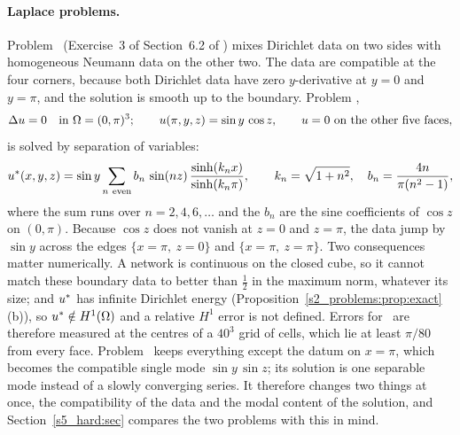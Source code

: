 \paragraph{Laplace problems.}
Problem \PLtwo\ (Exercise~3 of Section~6.2 of \citet{strauss2008}) mixes Dirichlet data on two
sides with homogeneous Neumann data on the other two. The data are compatible at the four
corners, because both Dirichlet data have zero $y$-derivative at $y=0$ and $y=\pi$, and the
solution is smooth up to the boundary. Problem \PLthree,
\begin{equation}\label{s2_problems:eq:lap3d}
\Delta u=0\quad\text{in }\Omega=(0,\pi)^3;\qquad u(\pi,y,z)=\sin y\,\cos z,\qquad
u=0\ \text{on the other five faces,}
\end{equation}
is solved by separation of variables:
\begin{equation}\label{s2_problems:eq:lap3d-exact}
u^{*}(x,y,z)=\sin y\sum_{n\ \mathrm{even}} b_n\,\sin(nz)\,\frac{\sinh(k_n x)}{\sinh(k_n\pi)},
\qquad k_n=\sqrt{1+n^2},\quad b_n=\frac{4n}{\pi(n^2-1)},
\end{equation}
where the sum runs over $n=2,4,6,\dots$ and the $b_n$ are the sine coefficients of $\cos z$
on $(0,\pi)$. Because $\cos z$ does not vanish at $z=0$ and $z=\pi$, the data jump by
$\sin y$ across the edges $\{x=\pi,\ z=0\}$ and $\{x=\pi,\ z=\pi\}$. Two consequences matter
numerically. A network is continuous on the closed cube, so it cannot match these boundary
data to better than $\tfrac12$ in the maximum norm, whatever its size; and $u^{*}$ has
infinite Dirichlet energy (Proposition~\ref{s2_problems:prop:exact}(b)), so
$u^{*}\notin H^1(\Omega)$ and a relative $H^1$ error is not defined. Errors for \PLthree\ are
therefore measured at the centres of a $40^3$ grid of cells, which lie at least $\pi/80$
from every face.
Problem \PLthreeS\ keeps everything except the datum on $x=\pi$, which becomes the compatible
single mode $\sin y\,\sin z$; its solution is one separable mode instead of a slowly
converging series. It therefore changes two things at once, the compatibility of the data
and the modal content of the solution, and Section~\ref{s5_hard:sec} compares the two
problems with this in mind.

